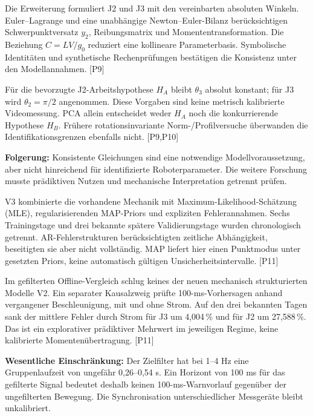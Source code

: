 \documentclass[11pt,a4paper]{article}
\newcommand{\src}[1]{{\footnotesize\color{muted}[#1]}}
\begin{document}
Die Erweiterung formuliert J2 und J3 mit den vereinbarten absoluten Winkeln. Euler--Lagrange und eine unabhängige Newton--Euler-Bilanz berücksichtigen Schwerpunktversatz $y_2$, Reibungsmatrix und Momententransformation. Die Beziehung $C=LV/g_0$ reduziert eine kollineare Parameterbasis. Symbolische Identitäten und synthetische Rechenprüfungen bestätigen die Konsistenz unter den Modellannahmen. \src{P9}

Für die bevorzugte J2-Arbeitshypothese $H_A$ bleibt $\theta_3$ absolut konstant; für J3 wird $\theta_2=\pi/2$ angenommen. Diese Vorgaben sind keine metrisch kalibrierte Videomessung. PCA allein entscheidet weder $H_A$ noch die konkurrierende Hypothese $H_B$. Frühere rotationsinvariante Norm-/Profilversuche überwanden die Identifikationsgrenzen ebenfalls nicht. \src{P9,P10}

\textbf{Folgerung:} Konsistente Gleichungen sind eine notwendige Modellvoraussetzung, aber nicht hinreichend für identifizierte Roboterparameter. Die weitere Forschung musste prädiktiven Nutzen und mechanische Interpretation getrennt prüfen.

V3 kombinierte die vorhandene Mechanik mit Maximum-Likelihood-Schätzung (MLE), regularisierenden MAP-Priors und expliziten Fehlerannahmen. Sechs Trainingstage und drei bekannte spätere Validierungstage wurden chronologisch getrennt. AR-Fehlerstrukturen berücksichtigten zeitliche Abhängigkeit, beseitigten sie aber nicht vollständig. MAP liefert hier einen Punktmodus unter gesetzten Priors, keine automatisch gültigen Unsicherheitsintervalle. \src{P11}

Im gefilterten Offline-Vergleich schlug keines der neuen mechanisch strukturierten Modelle V2. Ein separater Kausalzweig prüfte 100-ms-Vorhersagen anhand vergangener Beschleunigung, mit und ohne Strom. Auf den drei bekannten Tagen sank der mittlere Fehler durch Strom für J3 um 4,004\,\% und für J2 um 27,588\,\%. Das ist ein explorativer prädiktiver Mehrwert im jeweiligen Regime, keine kalibrierte Momentenübertragung. \src{P11}

\textbf{Wesentliche Einschränkung:} Der Zielfilter hat bei 1--4 Hz eine Gruppenlaufzeit von ungefähr 0,26--0,54 s. Ein Horizont von 100 ms für das gefilterte Signal bedeutet deshalb keinen 100-ms-Warnvorlauf gegenüber der ungefilterten Bewegung. Die Synchronisation unterschiedlicher Messgeräte bleibt unkalibriert.
\end{document}
